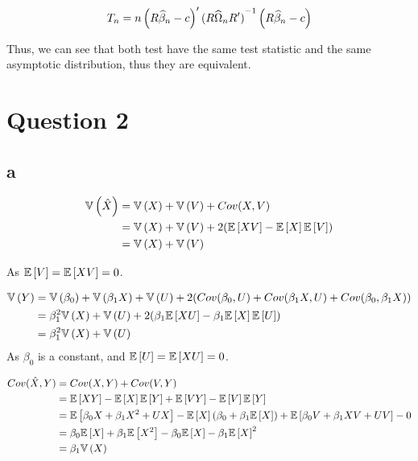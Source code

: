\documentclass[12pt]{paper}
\begin{document}
\begin{equation*}
 T_n=n\left(  R \est{\beta} - c \right)'  \inv{(R\est{\Omega}R')}  \left(  R \est{\beta} - c \right)
\end{equation*}

Thus, we can see that both test have the same test statistic and the same asymptotic distribution, thus they are equivalent.

\section*{Question 2}

\subsection*{a}

\begin{align*}
  \Vari{\hat{X}} &= \Vari{X} + \Vari{V} + Cov( X, V)\\
                 &= \Vari{X} + \Vari{V} + 2(\exV{XV} - \exV{X}\exV{V})\\
                 &= \Vari{X} + \Vari{V}\\
\end{align*}

As $\exV{V} = \exV{XV} = 0$.

\begin{align*}
  \Vari{Y} &= \Vari{\beta_0} + \Vari{\beta_1 X} + \Vari{U} +2( Cov( \beta_0, U) +
             Cov( \beta_1 X, U) + Cov( \beta_0, \beta_1 X))\\
           &= \beta_1^2 \Vari{X} + \Vari{U} + 2(\beta_1 \exV{XU} - \beta_1 \exV{X} \exV{U})\\
  &= \beta_1^2 \Vari{X} + \Vari{U}\\
\end{align*}
As $\beta_0$ is a constant, and $\exV{U} = \exV{XU} = 0$.

\begin{align*}
  Cov( \hat{X}, Y) &= Cov( X, Y) + Cov( V, Y)\\
                   &= \exV{XY} - \exV{X}\exV{Y} + \exV{VY} - \exV{V}\exV{Y}\\
  &= \exV{\beta_0 X + \beta_1 X^2 + UX} - \exV{X}(\beta_0 + \beta_1 \exV{X}) + \exV{
    \beta_0 V + \beta_1 XV + UV} - 0\\
  &= \beta_0 \exV{X} + \beta_1 \exV{X^2} - \beta_0 \exV{X} - \beta_1 \exV{X}^2\\
  &= \beta_1 \Vari{X}
\end{align*}
\end{document}
